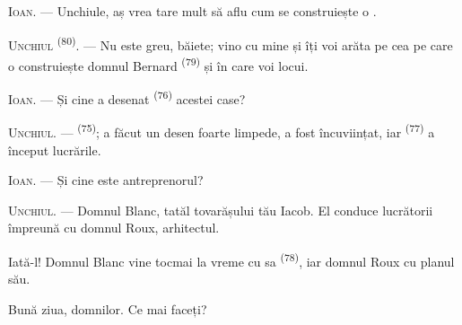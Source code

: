 %
%
%

\VUsaut{6.0mm}
\VUsaut{1.4mm}
\VUsaut{2.2mm}

\VUsaut{3.0mm}

\textsc{Ioan}. --- Unchiule, aș vrea tare mult să aflu cum se construiește o
.

\textsc{Unchiul} \textsuperscript{(80)}. --- Nu este greu, băiete; vino cu mine și
îți voi arăta pe cea pe care o construiește domnul Bernard \textsuperscript{(79)}
și în care voi locui.

\textsc{Ioan}. --- Și cine a desenat  \textsuperscript{(76)} acestei
case?

\textsc{Unchiul}. ---  \textsuperscript{(75)}; a făcut un desen
foarte limpede, a fost încuviințat, iar 
\textsuperscript{(77)} a început lucrările.

\textsc{Ioan}. --- Și cine este antreprenorul?

\textsc{Unchiul}. --- Domnul Blanc, tatăl tovarășului tău Iacob. El conduce
lucrătorii împreună cu domnul Roux, arhitectul.

Iată-l! Domnul Blanc vine tocmai la vreme cu  sa
\textsuperscript{(78)}, iar domnul Roux cu planul său.

Bună ziua, domnilor. Ce mai faceți?

